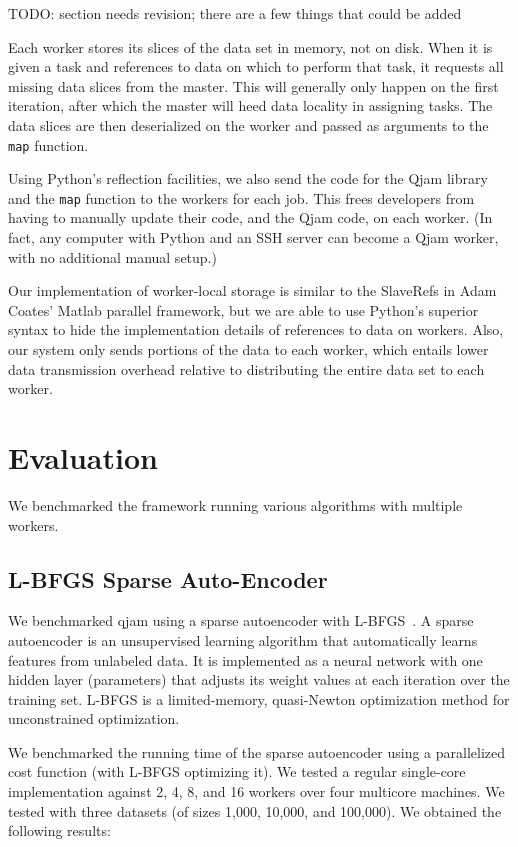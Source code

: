 \documentclass[%
  final,
  notitlepage,
  narroweqnarray,
  inline,
]{ieee}
\begin{document}
TODO: section needs revision; there are a few things that could be added

Each worker stores its slices of the data set in memory, not on disk. When it
is given a task and references to data on which to perform that task, it
requests all missing data slices from the master. This will generally only
happen on the first iteration, after which the master will heed data locality
in assigning tasks. The data slices are then deserialized on the worker and
passed as arguments to the {\tt map} function.

Using Python's reflection facilities, we also send the code for the Qjam
library and the {\tt map} function to the workers for each job. This frees
developers from having to manually update their code, and the Qjam code, on
each worker. (In fact, any computer with Python and an SSH server can become a
Qjam worker, with no additional manual setup.)

Our implementation of worker-local storage is similar to the SlaveRefs in Adam
Coates' Matlab parallel framework, but we are able to use Python's superior
syntax to hide the implementation details of references to data on
workers. Also, our system only sends portions of the data to each worker, which
entails lower data transmission overhead relative to distributing the entire
data set to each worker.



\section{Evaluation}

We benchmarked the framework running various algorithms with multiple workers.

\subsection{L-BFGS Sparse Auto-Encoder}

We benchmarked qjam using a sparse autoencoder with L-BFGS~\cite{lbfgs}. A
sparse autoencoder is an unsupervised learning algorithm that automatically
learns features from unlabeled data. It is implemented as a neural network with
one hidden layer (parameters) that adjusts its weight values at each iteration
over the training set. L-BFGS is a limited-memory, quasi-Newton optimization
method for unconstrained optimization.

We benchmarked the running time of the sparse autoencoder using a parallelized
cost function (with L-BFGS optimizing it). We tested a regular single-core
implementation against 2, 4, 8, and 16 workers over four multicore machines. We
tested with three datasets (of sizes 1,000, 10,000, and 100,000). We obtained
the following results:
\end{document}
